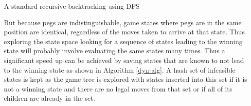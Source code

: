 \documentclass[10pt]{article}
\begin{document}
\begin{algorithm}[H]
	\DontPrintSemicolon
  \label{standard-dfs}
	\caption{A standard recursive backtracking using DFS}
\end{algorithm}
\newpage
But because pegs are indistinguishable, game states where pegs are in the same position are identical, regardless of the moves taken to arrive at that state. Thus exploring the state space looking for a sequence of states leading to the winning state will probably involve evaluating the same states many times. Thus a significant speed up can be achieved by saving states that are known to not lead to the winning state as shown in Algorithm \autoref{dyn-alg}. A hash set of infeasible states is kept as the game tree is explored with states inserted into this set if it is not a winning state and there are no legal moves from that set or if all of its children are already in the set.
\end{document}
